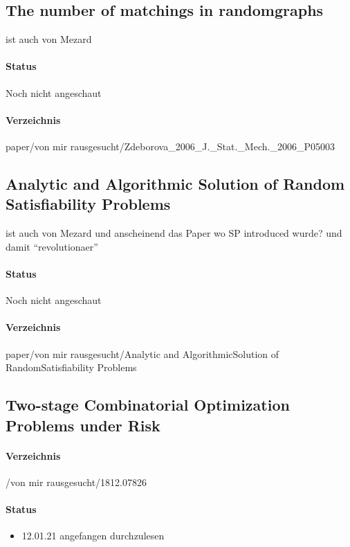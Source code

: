 \documentclass[paper=a4,10pt]{scrartcl}
\begin{document}
\subsection{The number of matchings in randomgraphs}

ist auch von Mezard

\paragraph{Status} Noch nicht angeschaut
\paragraph{Verzeichnis} paper/von mir rausgesucht/Zdeborova\_2006\_J.\_Stat.\_Mech.\_2006\_P05003

\subsection{Analytic and Algorithmic Solution of Random Satisfiability Problems}

ist auch von Mezard und anscheinend das Paper wo SP introduced wurde? und damit ``revolutionaer''

\paragraph{Status} Noch nicht angeschaut
\paragraph{Verzeichnis} paper/von mir rausgesucht/Analytic and AlgorithmicSolution of RandomSatisfiability Problems


\subsection{Two-stage Combinatorial Optimization Problems under Risk}
\label{sec:paper1}
\paragraph{Verzeichnis} /von mir rausgesucht/1812.07826
\paragraph{Status}
\begin{itemize}
\item 12.01.21 angefangen durchzulesen
\end{itemize}
\end{document}
